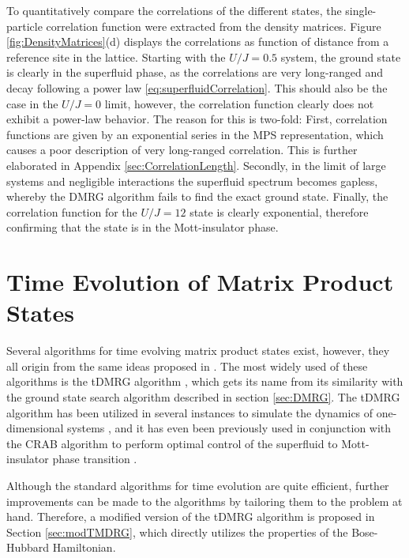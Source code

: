 To quantitatively compare the correlations of the different states, the single-particle correlation function were extracted from the density matrices. Figure \ref{fig:DensityMatrices}(d) displays the correlations as function of distance from a reference site in the lattice.
Starting with the $U/J = 0.5$ system, the ground state is clearly in the superfluid phase, as the correlations are very long-ranged and decay following a power law \eqref{eq:superfluidCorrelation}. This should also be the case in the $U/J = 0$ limit, however, the correlation function clearly does not exhibit a power-law behavior. The reason for this is two-fold: First, correlation functions are given by an exponential series in the MPS representation, which causes a poor description of very long-ranged correlation. This is further elaborated in Appendix \ref{sec:CorrelationLength}. Secondly, in the limit of large systems and negligible interactions the superfluid spectrum becomes gapless, whereby the DMRG algorithm fails to find the exact ground state. Finally, the correlation function for the $U/J = 12$ state is clearly exponential, therefore confirming that the state is in the Mott-insulator phase.



\section{Time Evolution of Matrix Product States}
Several algorithms for time evolving matrix product states exist, however, they all origin from the same ideas proposed in \cite{Vidal2003,Vidal2004}. The most widely used of these algorithms is the tDMRG algorithm \cite{Daley2004}, which gets its name from its similarity with the ground state search algorithm described in section \ref{sec:DMRG}. The tDMRG algorithm has been utilized in several instances to simulate the dynamics of one-dimensional systems \cite{Verstraete2004,Vznidarivc2008,Cazalilla2002}, and it has even been previously used in conjunction with the CRAB algorithm to perform optimal control of the superfluid to Mott-insulator phase transition \cite{FrankBloch,Doria2011}.

Although the standard algorithms for time evolution are quite efficient, further improvements can be made to the algorithms by tailoring them to the problem at hand. Therefore, a modified version of the tDMRG algorithm is proposed in Section \ref{sec:modTMDRG}, which directly utilizes the properties of the Bose-Hubbard Hamiltonian.


